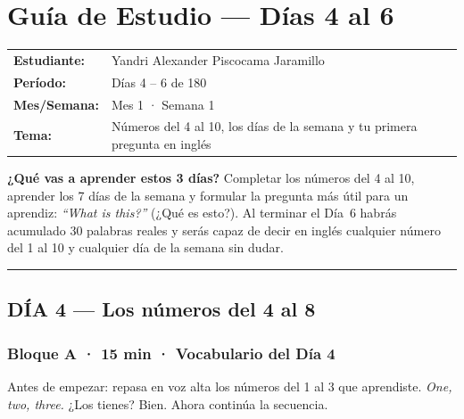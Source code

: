 
\chapter*{Guía de Estudio — Días 4 al 6}
\label{ch:guia_dia4_6}

\noindent
\begin{tabular}{@{}ll@{}}
  \textbf{Estudiante:} & Yandri Alexander Piscocama Jaramillo \\
  \textbf{Período:}    & Días 4 -- 6 de 180 \\
  \textbf{Mes/Semana:} & Mes 1 · Semana 1 \\
  \textbf{Tema:}       & Números del 4 al 10, los días de la semana
                         y tu primera pregunta en inglés \\
\end{tabular}

\bigskip
\noindent
\textbf{¿Qué vas a aprender estos 3 días?}
Completar los números del 4 al 10, aprender los 7 días de la
semana y formular la pregunta más útil para un aprendiz:
\textit{``What is this?''} (¿Qué es esto?).
Al terminar el Día~6 habrás acumulado 30 palabras reales y serás
capaz de decir en inglés cualquier número del 1 al 10 y cualquier
día de la semana sin dudar.

\bigskip
\noindent\rule{\textwidth}{0.4pt}

\section*{DÍA 4 — Los números del 4 al 8}
\label{sec:dia4}

\subsection*{Bloque A · 15 min · Vocabulario del Día 4}

\noindent
Antes de empezar: repasa en voz alta los números del 1 al 3 que
aprendiste. \textit{One, two, three.} ¿Los tienes? Bien. Ahora
continúa la secuencia.


